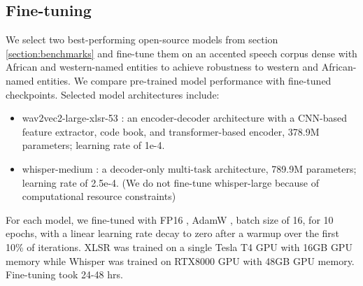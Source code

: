 \documentclass{INTERSPEECH2023}
\begin{document}
\subsection{Fine-tuning}
We select two best-performing open-source models from section \ref{section:benchmarks} and fine-tune them on an accented speech corpus dense with African and western-named entities to achieve robustness to western and African-named entities. We compare pre-trained model performance with fine-tuned checkpoints. Selected model architectures include:
\begin{itemize}
    \item wav2vec2-large-xlsr-53 \cite{grosman2021xlsr53-large-english}: an encoder-decoder architecture with a CNN-based feature extractor, code book, and transformer-based encoder, 378.9M parameters; learning rate of 1e-4.
    \item whisper-medium \cite{radford2022robust}: a decoder-only multi-task architecture, 789.9M parameters; learning rate of 2.5e-4. (We do not fine-tune whisper-large because of computational resource constraints)
\end{itemize}

For each model, we fine-tuned with FP16 \cite{micikevicius2017mixed}, AdamW \cite{loshchilov2019decoupled}, batch size of 16, for 10 epochs, with a linear learning rate decay to zero after a warmup over the first 10\% of iterations. XLSR was trained on a single Tesla T4 GPU with 16GB GPU memory while Whisper was trained on RTX8000 GPU with 48GB GPU memory. Fine-tuning took 24-48 hrs.



\end{document}
